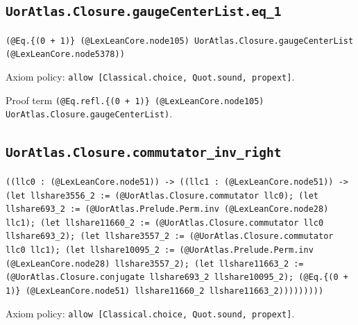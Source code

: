 \documentclass[11pt]{article}
\begin{document}
\subsection*{\texttt{UorAtlas.Closure.gaugeCenterList.eq\_1}}
\noindent\texttt{(@Eq.\{(0 + 1)\} (@LexLeanCore.node105) UorAtlas.Closure.gaugeCenterList (@LexLeanCore.node5378))}\par
\noindent Axiom policy: \texttt{allow [Classical.choice, Quot.sound, propext]}.\par
\noindent Proof term \texttt{(@Eq.refl.\{(0 + 1)\} (@LexLeanCore.node105) UorAtlas.Closure.gaugeCenterList)}.\par
\subsection*{\texttt{UorAtlas.Closure.commutator\_inv\_right}}
\noindent\texttt{((llc0 : (@LexLeanCore.node51)) -> ((llc1 : (@LexLeanCore.node51)) -> (let llshare3556\_2 := (@UorAtlas.Closure.commutator llc0); (let llshare693\_2 := (@UorAtlas.Prelude.Perm.inv (@LexLeanCore.node28) llc1); (let llshare11660\_2 := (@UorAtlas.Closure.commutator llc0 llshare693\_2); (let llshare3557\_2 := (@UorAtlas.Closure.commutator llc0 llc1); (let llshare10095\_2 := (@UorAtlas.Prelude.Perm.inv (@LexLeanCore.node28) llshare3557\_2); (let llshare11663\_2 := (@UorAtlas.Closure.conjugate llshare693\_2 llshare10095\_2); (@Eq.\{(0 + 1)\} (@LexLeanCore.node51) llshare11660\_2 llshare11663\_2)))))))))}\par
\noindent Axiom policy: \texttt{allow [Classical.choice, Quot.sound, propext]}.\par
\end{document}
